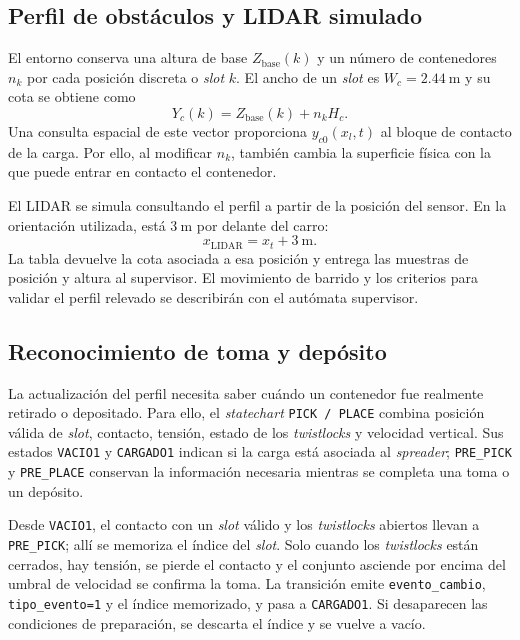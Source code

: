 \documentclass[a4paper,10pt,onecolumn,journal]{ieeeconf}
\numberwithin{equation}{section}
\begin{document}
\subsection{Perfil de obstáculos y LIDAR simulado}
\label{sec:entorno_planta}
El entorno conserva una altura de base $Z_{\mathrm{base}}(k)$ y un número de contenedores $n_k$ por cada posición discreta o \textit{slot} $k$. El ancho de un \textit{slot} es $W_c=2.44~\mathrm{m}$ y su cota se obtiene como
\begin{equation}
Y_c(k)=Z_{\mathrm{base}}(k)+n_kH_c.
\label{eq:perfil_slots}
\end{equation}
Una consulta espacial de este vector proporciona $y_{c0}(x_l,t)$ al bloque de contacto de la carga. Por ello, al modificar $n_k$, también cambia la superficie física con la que puede entrar en contacto el contenedor.

El LIDAR se simula consultando el perfil a partir de la posición del sensor. En la orientación utilizada, está $3~\mathrm{m}$ por delante del carro:
\begin{equation}
x_{\mathrm{LIDAR}}=x_t+3~\mathrm{m}.
\end{equation}
La tabla devuelve la cota asociada a esa posición y entrega las muestras de posición y altura al supervisor. El movimiento de barrido y los criterios para validar el perfil relevado se describirán con el autómata supervisor.

\subsection{Reconocimiento de toma y depósito}
La actualización del perfil necesita saber cuándo un contenedor fue realmente retirado o depositado. Para ello, el \textit{statechart} \texttt{PICK / PLACE} combina posición válida de \textit{slot}, contacto, tensión, estado de los \textit{twistlocks} y velocidad vertical. Sus estados \texttt{VACIO1} y \texttt{CARGADO1} indican si la carga está asociada al \textit{spreader}; \texttt{PRE\_PICK} y \texttt{PRE\_PLACE} conservan la información necesaria mientras se completa una toma o un depósito.

Desde \texttt{VACIO1}, el contacto con un \textit{slot} válido y los \textit{twistlocks} abiertos llevan a \texttt{PRE\_PICK}; allí se memoriza el índice del \textit{slot}. Solo cuando los \textit{twistlocks} están cerrados, hay tensión, se pierde el contacto y el conjunto asciende por encima del umbral de velocidad se confirma la toma. La transición emite \texttt{evento\_cambio}, \texttt{tipo\_evento=1} y el índice memorizado, y pasa a \texttt{CARGADO1}. Si desaparecen las condiciones de preparación, se descarta el índice y se vuelve a vacío.
\end{document}
